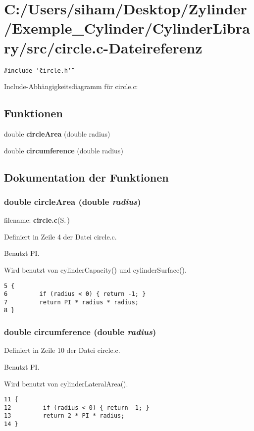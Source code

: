 \section{C:/Users/siham/Desktop/Zylinder/Exemple\_\-Cylinder/Cylinder\-Library/src/circle.c-Dateireferenz}
\label{circle_8c}
{\tt \#include \char`\"{}circle.h\char`\"{}}\par


Include-Abh\"{a}ngigkeitsdiagramm f\"{u}r circle.c:\subsection*{Funktionen}
\begin{CompactItemize}
\item 
double {\bf circle\-Area} (double radius)
\item 
double {\bf circumference} (double radius)
\end{CompactItemize}


\subsection{Dokumentation der Funktionen}
\subsubsection{\setlength{\rightskip}{0pt plus 5cm}double circle\-Area (double {\em radius})}\label{circle_8c_ef6c48edf38069b2b3684a790d806b92}


filename: {\bf circle.c}{\rm (S.\,\pageref{circle_8c})} 

Definiert in Zeile 4 der Datei circle.c.

Benutzt PI.

Wird benutzt von cylinder\-Capacity() und cylinder\-Surface().

\footnotesize\begin{verbatim}5 {
6         if (radius < 0) { return -1; }
7         return PI * radius * radius;
8 }
\end{verbatim}\normalsize 


\subsubsection{\setlength{\rightskip}{0pt plus 5cm}double circumference (double {\em radius})}\label{circle_8c_e48234f11885e6a380e29e50f272c7b4}




Definiert in Zeile 10 der Datei circle.c.

Benutzt PI.

Wird benutzt von cylinder\-Lateral\-Area().

\footnotesize\begin{verbatim}11 {
12         if (radius < 0) { return -1; }
13         return 2 * PI * radius;
14 }
\end{verbatim}\normalsize 


